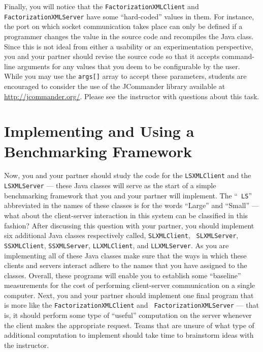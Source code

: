 Finally, you will notice that the {\tt FactorizationXMLClient} and {\tt FactorizationXMLServer} have some
``hard-coded'' values in them. For instance, the port on which socket communication takes place can only be defined if a
programmer changes the value in the source code and recompiles the Java class. Since this is not ideal from either a
usability or an experimentation perspective, you and your partner should revise the source code so that it accepts
command-line arguments for any values that you deem to be configurable by the user. While you may use the {\tt args[]}
array to accept these parameters, students are encouraged to consider the use of the JCommander library available at
\url{http://jcommander.org/}. Please see the instructor with questions about this task.

\section*{Implementing and Using a Benchmarking Framework}

Now, you and your partner should study the code for the {\tt LSXMLClient} and the {\tt LSXMLServer} --- these Java
classes will serve as the start of a simple benchmarking framework that you and your partner will implement. The ``{\tt
LS}'' abbreviated in the names of these classes is for the words ``Large'' and ``Small'' --- what about the
client-server interaction in this system can be classified in this fashion? After discussing this question with your
partner, you should implement six additional Java classes respectively called, {\tt SLXMLClient}, {\tt
SLXMLServer}, {\tt SSXMLClient}, {\tt SSXMLServer}, {\tt LLXMLClient}, and {\tt LLXMLServer}. As you are
implementing all of these Java classes make sure that the ways in which these clients and servers interact adhere to the
names that you have assigned to the classes. Overall, these programs will enable you to establish some ``baseline''
measurements for the cost of performing client-server communication on a single computer. Next, you and your partner
should implement one final program that is more like the {\tt FactorizationXMLClient} and {\tt
FactorizationXMLServer} --- that is, it should perform some type of ``useful'' computation on the server whenever the
client makes the appropriate request. Teams that are unsure of what type of additional computation to
implement should take time to brainstorm ideas with the instructor.

